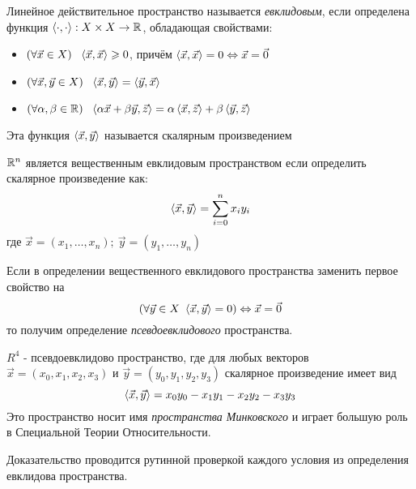 \begin{definition}
	Линейное действительное пространство называется \textit{евклидовым},
	если определена функция $\left\langle\cdot, \cdot\right\rangle: X \times X \rightarrow
	\mathbb{R}$, обладающая свойствами:
	\begin{itemize}
		\item $(\forall \vec{x} \in X)\ \ \trbr{\vec{x},
			\vec{x}} \ge 0$, причём $\left\langle\vec{x}, \vec{x}\right\rangle =
			0 \Leftrightarrow \vec{x} = \vec{0}$
		
		\item $(\forall \vec{x}, \vec{y} \in X)\ \ 
			\trbr{\vec{x}, \vec{y}} = \trbr{\vec{y}, \vec{x}}$
		
		\item $(\forall \alpha, \beta \in \R)\ \ 
			\trbr{\alpha\vec{x} + \beta\vec{y}, \vec{z}} =
			\alpha\trbr{\vec{x}, \vec{z}} + \beta\trbr{\vec{y}, \vec{z}}$
	\end{itemize}
	Эта функция $\left\langle\vec{x}, \vec{y}\right\rangle$ называется скалярным
	произведением
\end{definition}

\begin{lemma}
	$\mathbb{R}^n$ является вещественным евклидовым
	пространством если определить скалярное произведение как:
	\[
		\left\langle\vec{x}, \vec{y}\right\rangle = \sum\limits_{i = 0}^n x_iy_i
	\]
	где $\vec{x} = (x_1, \ldots, x_n);\ \vec{y} = (y_1, \ldots, y_n)$
\end{lemma}

\begin{addition}
	Если в определении вещественного евклидового пространства
	заменить первое свойство на
	\[
	(\forall \vec{y} \in X\ \trbr{\vec{x}, \vec{y}} = 0)
		\lra \vec{x} = \vec{0}
	\]
	то получим определение \textit{псевдоевклидового} пространства.
\end{addition}

\begin{example}
	$R^4$ - псевдоевклидово пространство, где для любых векторов
	$\vec{x} = (x_0, x_1, x_2, x_3)$ и $\vec{y} = (y_0, y_1, y_2, y_3)$
	скалярное произведение имеет вид
	\[
		\left\langle\vec{x}, \vec{y}\right\rangle = x_0 y_0 - x_1 y_1 - x_2 y_2 - x_3 y_3
	\]
	Это пространство носит имя \textit{пространства Минковского} и
	играет большую роль в Специальной Теории Относительности.
\end{example}

\begin{idea}
	Доказательство проводится рутинной проверкой каждого
	условия из определения евклидова пространства.
\end{idea}

